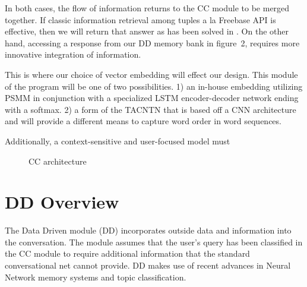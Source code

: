 \documentclass[10pt,twoside,twocolumn]{article}
\begin{document}
\noindent
In both cases, the flow of information returns to the CC module to be merged together. If classic information retrieval among tuples a la Freebase API is effective, then we will return that answer as has been solved in \cite{Iyyer2014, Yao2014a, Yao2014b}. On the other hand, accessing a response from our DD memory bank in figure~2, requires more innovative integration of information.

\noindent
This is where our choice of vector embedding will effect our design. This module of the program will be one of two possibilities. 1) an in-house embedding utilizing PSMM \cite{Merity2016} in conjunction with a specialized LSTM encoder-decoder network ending with a softmax. 2) a form of the TACNTN \cite{Wu} that is based off a CNN architecture and will provide a different means to capture word order in word sequences.

\noindent
Additionally, a context-sensitive and user-focused model must 

\begin{figure}[H]
    \centering
    
    \label{CCdesign}
    \caption{CC architecture}
\end{figure}

\section{DD Overview}
The Data Driven module (DD) incorporates outside data and information into the conversation. The module assumes that the user's query has been classified in the CC module to require additional information that the standard conversational net cannot provide. DD makes use of recent advances in Neural Network memory systems and topic classification.
\end{document}
